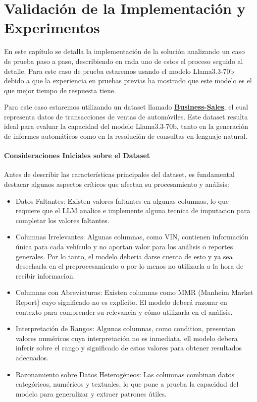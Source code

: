 \chapter{Validación de la Implementación y Experimentos}\label{chapter:implementation}

En este capítulo se detalla la implementación de la solución analizando un caso de prueba paso a paso, describiendo en cada uno de estos el proceso seguido al detalle. Para este caso de prueba estaremos usando el modelo Llama3.3-70b debido a que la experiencia en pruebas previas ha mostrado que este modelo es el que mejor tiempo de respuesta tiene.

Para este caso estaremos utilizando un dataset llamado \href{https://huggingface.co/datasets/sayanroy058/Business-Sales/viewer}{\textbf{Business-Sales}}, el cual representa datos de transacciones de ventas de automóviles. Este dataset resulta ideal para evaluar la capacidad del modelo Llama3.3-70b, tanto en la generación de informes automáticos como en la resolución de consultas en lenguaje natural.

\subsubsection{Consideraciones Iniciales sobre el Dataset}
Antes de describir las características principales del dataset, es fundamental destacar algunos aspectos críticos que afectan su procesamiento y análisis:
\begin{itemize}
	\item{Datos Faltantes:}
	Existen valores faltantes en algunas columnas, lo que requiere que el LLM analice e implemente alguna tecnica de imputacion para completar los valores faltantes.
	
	\item{Columnas Irrelevantes:}
	Algunas columnas, como VIN, contienen información única para cada vehículo y no aportan valor para los análisis o reportes generales. Por lo tanto, el modelo deberia darse cuenta de esto y ya sea desecharla en el preprocesamiento o por lo menos no utilizarla a la hora de recibir informacion.
	
	\item{Columnas con Abreviaturas:}
	Existen columnas como MMR (Manheim Market Report) cuyo significado no es explícito. El modelo deberá razonar en contexto para comprender su relevancia y cómo utilizarla en el análisis.
	
	\item{Interpretación de Rangos:}
	Algunas columnas, como condition, presentan valores numéricos cuya interpretación no es inmediata, ell modelo debera inferir sobre el rango y significado de estos valores para obtener resultados adecuados.
	
	\item{Razonamiento sobre Datos Heterogéneos:}
	Las columnas combinan datos categóricos, numéricos y textuales, lo que pone a prueba la capacidad del modelo para generalizar y extraer patrones útiles.
\end{itemize}
